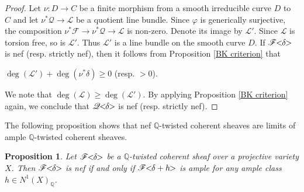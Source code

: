 \documentclass[english,reqno]{amsart}
\newcommand\bbQ{{\mathbb Q}}
\newcommand\sF{{\mathscr F}}
\newcommand\sL{{\mathscr L}}
\newcommand\sQ{{\mathscr Q}}
\theoremstyle{plain}
\newtheorem{prop}[thm]{Proposition}
\theoremstyle{definition}
\numberwithin{equation}{section} %
\begin{document}
\begin{proof}
    Let $\nu\colon D\rightarrow C$ be a finite morphism from a smooth irreducible curve $D$ to $C$ and let $\nu^*\sQ\rightarrow \sL$ be a quotient line bundle.
    Since $\varphi$ is generically surjective, the composition
    $
    \nu^*\sF\rightarrow \nu^*\sQ\rightarrow \sL
    $
    is non-zero. Denote its image by $\sL'$. Since $\sL$ is torsion free, so is  $\sL'$. Thus $\sL'$ is a line bundle on the smooth curve $D$. If $\sF\hspace{-0.8ex}<\hspace{-0.8ex}\delta\hspace{-0.8ex}>$ is nef (resp. strictly nef),  then it follows from Proposition \ref{BK criterion} that
    \begin{center}
        $\deg(\sL')+\deg(\nu^*\delta)\geqslant 0$ (resp. $>0$).
    \end{center}
    We note that $\deg(\sL)\geqslant \deg(\sL')$. By applying Proposition \ref{BK criterion} again, we conclude that $\sQ\hspace{-0.8ex}<\hspace{-0.8ex}\delta\hspace{-0.8ex}>$ is nef (resp. strictly nef).
\end{proof}

The following proposition shows that nef $\bbQ$-twisted coherent sheaves are limits of ample $\bbQ$-twisted coherent sheaves.

\begin{prop}\cite[Proposition 6.2.11]{Lazarsfeld2004a}\label{Limit-ample}
    Let $\sF\hspace{-0.8ex}<\hspace{-0.8ex}\delta\hspace{-0.8ex}>$ be a $\bbQ$-twisted coherent sheaf over a projective variety $X$. Then $\sF\hspace{-0.8ex}<\hspace{-0.8ex}\delta\hspace{-0.8ex}>$ is nef if and only if $\sF\hspace{-0.8ex}<\hspace{-0.8ex}\delta+h\hspace{-0.8ex}>$ is ample for any ample class $h\in N^1(X)_{\bbQ}$.
\end{prop}
\end{document}
